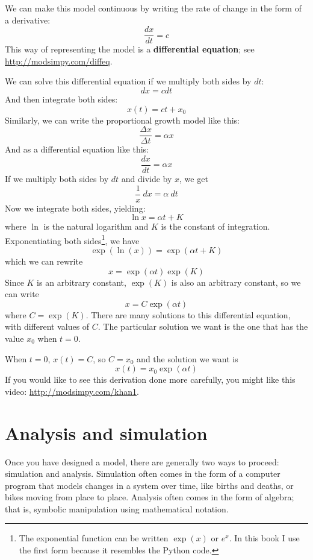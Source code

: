 \documentclass[12pt]{book}
\theoremstyle{exercise}
\begin{document}

We can make this model continuous by writing the rate of change in the form of a derivative:
%
\[ \frac{dx}{dt} = c \]
%
This way of representing the model is a {\bf differential equation}; see \url{http://modsimpy.com/diffeq}.


We can solve this differential equation if we multiply both sides by $dt$:
%
\[ dx = c dt \]
%
And then integrate both sides:
%
\[ x(t) = c t + x_0 \]
%
Similarly, we can write the proportional growth model like this:
%
\[ \frac{\Delta x}{\Delta t} = \alpha x \]
%
And as a differential equation like this:
%
\[ \frac{dx}{dt} = \alpha x \]
%
If we multiply both sides by $dt$ and divide by $x$, we get
%
\[ \frac{1}{x}~dx = \alpha~dt \] 
%
Now we integrate both sides, yielding:
%
\[ \ln x = \alpha t + K \]
%
where $\ln$ is the natural logarithm and $K$ is the constant of integration.  Exponentiating both sides\footnote{The exponential function can be written $\exp(x)$ or $e^x$.  In this book I use the first form because it resembles the Python code. }, we have
%
\[ \exp(\ln(x)) = \exp(\alpha t + K) \]
%
which we can rewrite
%
\[ x = \exp(\alpha t) \exp(K) \]
%
Since $K$ is an arbitrary constant, $\exp(K)$ is also an arbitrary constant, so we can write
%
\[ x = C \exp(\alpha t) \]
%
where $C = \exp(K)$.  There are many solutions to this differential equation, with different values of $C$.  The particular solution we want is the one that has the value $x_0$ when $t=0$. 

When $t=0$, $x(t) = C$, so $C = x_0$ and the solution we want is
%
\[ x(t) = x_0 \exp(\alpha t) \]
%
If you would like to see this derivation done more carefully, you might like this video: \url{http://modsimpy.com/khan1}.



\section{Analysis and simulation}

Once you have designed a model, there are generally two ways to proceed: simulation and analysis.  Simulation often comes in the form of a computer program that models changes in a system over time, like births and deaths, or bikes moving from place to place.  Analysis often comes in the form of algebra; that is, symbolic manipulation using mathematical notation.
\end{document}
